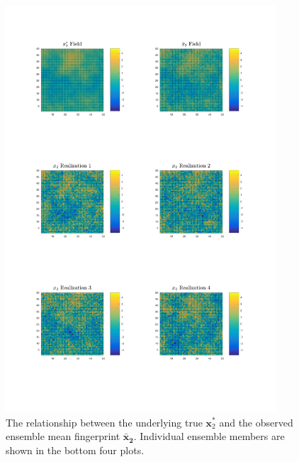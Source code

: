 \documentclass[12pt]{article}
\def\*#1{\bm{#1}}
\begin{document}
\begin{figure}[htbp]
\begin{center}
\includegraphics[width=0.9\textwidth]{figures/xgeneration2.png}
\caption{The relationship between the underlying true $\*x^*_2$ and the observed ensemble mean fingerprint $ \*{\bar x_2}$.  Individual ensemble members are shown in the bottom four plots.}
\label{fig:xfield2}
\end{center}
\end{figure}
\end{document}
